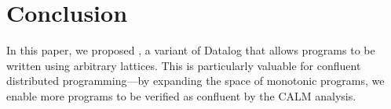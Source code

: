 \section{Conclusion}

In this paper, we proposed \lang, a variant of Datalog that allows programs to
be written using arbitrary lattices. This is particularly valuable for confluent
distributed programming---by expanding the space of monotonic programs, we
enable more programs to be verified as confluent by the CALM analysis.

\begin{comment}
\jmh{Some thoughts here to start.  More work this afternoon.}

Looking back:
\begin{itemize}
  \item \textbf{CALM Chills Out, and Distributed Programming wins!} The ability to prove confluence for a much broader range of constructs cracks one of the big remaining nuts in the Bloom agenda.  By marrying logic and lattices, it significantly advances the agenda delivering powerful, safe next-generation distributed languages.
  
  \item \textbf{Bloom programming is real nice now}:  The idea of using logic was to give us ``disorderly'' distributed programming a la MapReduce and SQL.  The convergent module approach went after the same goal from a more imperative perspective---``safe'' objects.  Both have their merits.  \lang's roots in logic still encourage set-wise, disorderly thinking, and the core construct of joining streams of events/messages with collections of stored facts is a nice way to capture asynchronous programming.  But stuff like counters are so very natural...
\end{itemize}

Looking forward:
\begin{itemize}
  \item \textbf{What more can we prove?}  Confluence is great when you can get it.  Checking for barrier-monotonicity is one nice thing for non-confluent designs.  But what more might we be able to do?
  \item \textbf{Efficiency and Optimization.}  Shopping carts still come in multiple flavors, but lattices start to smear the difference.  Is there hope for automatic program transformations in the \lang context that can tune an implementation optimally to workloads and elastic conditions?  What do the constraints of \lang provide that makes this question easier to tackle than a traditional imperative language?
  \item \textbf{Transactions.}  What about transactions, anyway?  If we want to provide transactional guarantees, how can \lang help---in terms of program specification, checking and optimization.
  \item \textbf{Your agenda goes here.}
\end{itemize}
\end{comment}
